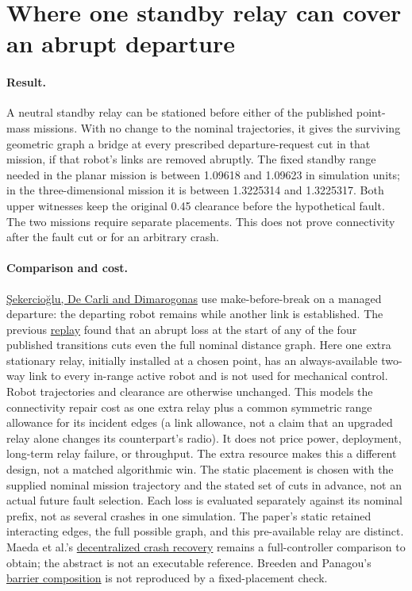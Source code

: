 \documentclass[11pt]{article}
\begin{document}
\section*{Where one standby relay can cover an abrupt departure}
\paragraph{Result.}
A neutral standby relay can be stationed before either of the published point-mass missions. With no change to the nominal trajectories, it gives the surviving geometric graph a bridge at every prescribed departure-request cut in that mission, if that robot's links are removed abruptly. The fixed standby range needed in the planar mission is between 1.09618 and 1.09623 in simulation units; in the three-dimensional mission it is between 1.3225314 and 1.3225317. Both upper witnesses keep the original 0.45 clearance before the hypothetical fault. The two missions require separate placements. This does not prove connectivity after the fault cut or for an arbitrary crash.

\paragraph{Comparison and cost.}
\href{https://arxiv.org/html/2609.29939v1}{\c{S}ekercio\u{g}lu, De Carli and Dimarogonas} use make-before-break on a managed departure: the departing robot remains while another link is established. The previous \href{https://github.com/eternal-november/eos-research-programmes/pull/439}{replay} found that an abrupt loss at the start of any of the four published transitions cuts even the full nominal distance graph. Here one extra stationary relay, initially installed at a chosen point, has an always-available two-way link to every in-range active robot and is not used for mechanical control. Robot trajectories and clearance are otherwise unchanged. This models the connectivity repair cost as one extra relay plus a common symmetric range allowance for its incident edges (a link allowance, not a claim that an upgraded relay alone changes its counterpart's radio). It does not price power, deployment, long-term relay failure, or throughput. The extra resource makes this a different design, not a matched algorithmic win. The static placement is chosen with the supplied nominal mission trajectory and the stated set of cuts in advance, not an actual future fault selection. Each loss is evaluated separately against its nominal prefix, not as several crashes in one simulation. The paper's static retained interacting edges, the full possible graph, and this pre-available relay are distinct. Maeda et al.'s \href{https://www.sciencedirect.com/science/article/pii/S0016003223003046}{decentralized crash recovery} remains a full-controller comparison to obtain; the abstract is not an executable reference. Breeden and Panagou's \href{https://arxiv.org/abs/2210.01354}{barrier composition} is not reproduced by a fixed-placement check.
\end{document}
